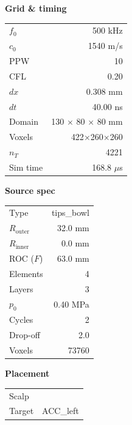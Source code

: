 \documentclass[11pt,letterpaper]{article}
\begin{document}
\begin{table}[h!]
\centering
\scriptsize
\setlength{\tabcolsep}{4pt}
\renewcommand{\arraystretch}{1.05}
\begin{minipage}[t]{0.32\linewidth}\centering
\textbf{Grid \& timing}\\[2pt]
\begin{tabular}{lr}
\toprule
$f_0$               & 500 kHz \\
$c_0$               & 1540 m/s \\
PPW                 & 10 \\
CFL                 & 0.20 \\
$dx$                & 0.308 mm \\
$dt$                & 40.00 ns \\
Domain              & 130 $\times$ 80 $\times$ 80 mm \\
Voxels              & 422$\times$260$\times$260 \\
$n_T$               & 4221 \\
Sim time            & 168.8 $\mu$s \\
\bottomrule
\end{tabular}
\end{minipage}\hfill
\begin{minipage}[t]{0.32\linewidth}\centering
\textbf{Source spec}\\[2pt]
\begin{tabular}{lr}
\toprule
Type             & tips\_bowl \\
$R_{\text{outer}}$ & 32.0 mm \\
$R_{\text{inner}}$ & 0.0 mm \\
ROC ($F$)        & 63.0 mm \\
Elements         & 4 \\
Layers           & 3 \\
$p_0$            & 0.40 MPa \\
Cycles           & 2 \\
Drop-off         & 2.0 \\
Voxels           & 73760 \\
\bottomrule
\end{tabular}
\end{minipage}\hfill
\begin{minipage}[t]{0.32\linewidth}\centering
\textbf{Placement}\\[2pt]
\begin{tabular}{lr}
\toprule
Scalp            &  \\
Target           & ACC\_left \\

\end{tabular}
\end{minipage}
\end{table}
\end{document}

